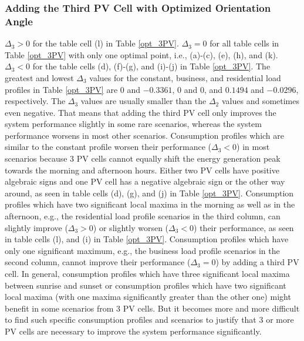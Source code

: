 \subsubsection{Adding the Third PV Cell with Optimized Orientation Angle} 
$\Delta_3>0$ for the table cell (l) in Table \ref{opt_3PV}. $\Delta_3=0$ for all table cells in Table \ref{opt_3PV} with only one optimal point, i.e., (a)-(c), (e), (h), and (k). $\Delta_3<0$ for the table cells (d), (f)-(g), and (i)-(j) in Table \ref{opt_3PV}. The greatest and lowest $\Delta_3$ values for the constant, business, and residential load profiles in Table \ref{opt_3PV} are $0$ and $-0.3361$, $0$ and $0$, and $0.1494$ and  $-0.0296$, respectively.
The $\Delta_3$ values are usually smaller than the $\Delta_2$ values and sometimes even negative. That means that adding the third PV cell only improves the system performance slightly in some rare scenarios, whereas the system performance worsens in most other scenarios. 
Consumption profiles which are similar to the constant profile worsen their performance ($\Delta_3<0$) in most scenarios because 3 PV cells cannot equally shift the energy generation peak towards the morning and afternoon hours. Either two PV cells have positive algebraic signs and one PV cell has a negative algebraic sign or the other way around, as seen in table cells (d), (g), and (j) in Table \ref{opt_3PV}. 
Consumption profiles which have two significant local maxima in the morning as well as in the afternoon, e.g., the residential load profile scenarios in the third column, can slightly improve ($\Delta_3>0$) or slightly worsen ($\Delta_3<0$) their performance, as seen in table cells (l), and (i) in Table \ref{opt_3PV}.
Consumption profiles which have only one significant maximum, e.g., the business load profile scenarios in the second column, cannot improve their performance (\mbox{$\Delta_3=0$}) by adding a third PV cell.
In general, consumption profiles which have three significant local maxima between sunrise and sunset or consumption profiles which have two significant local maxima (with one maxima significantly greater than the other one) might benefit in some scenarios from 3 PV cells. But it becomes more and more difficult to find such specific consumption profiles and scenarios to justify that 3 or more PV cells are necessary to improve the system performance significantly.



